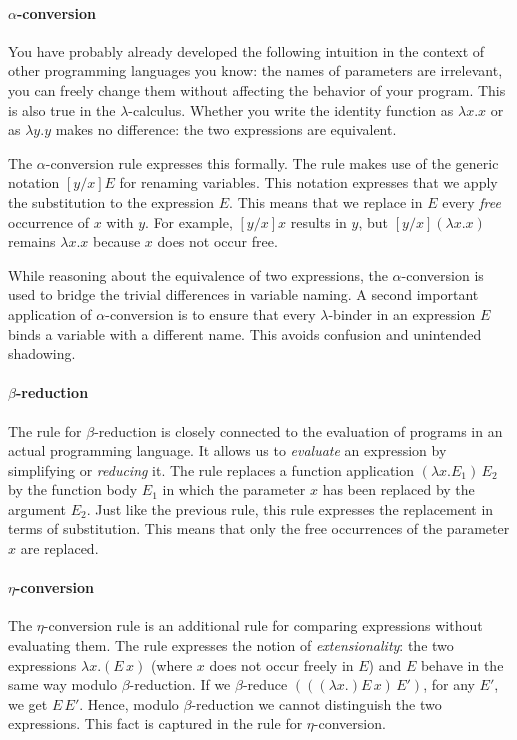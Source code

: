 \paragraph{$\alpha$-conversion}
You have probably already developed the following intuition in the context of
other programming languages you know: the names of parameters are irrelevant,
you can freely change them without affecting the behavior of your program.
This is also true in the $\lambda$-calculus. Whether you write the identity
function as $\lambda x.x$ or as $\lambda y.y$ makes no difference: the two
expressions are equivalent.

The $\alpha$-conversion rule expresses this formally. The rule
makes use of the generic notation
$[y/x]E$ for renaming variables. This notation expresses that
we apply the substitution to the expression
$E$. This means that we replace in $E$ every \textit{free} occurrence of $x$ 
with $y$. For example, $[y/x]x$ results in $y$, but $[y/x](\lambda x.x)$ remains $\lambda x.x$
because $x$ does not occur free.

While reasoning about the equivalence of two expressions, the
$\alpha$-conversion is used to bridge the trivial differences in variable
naming. A second important application of $\alpha$-conversion is to ensure that
every $\lambda$-binder in an expression $E$ binds a variable with a different name.
This avoids confusion and unintended shadowing.

\paragraph{$\beta$-reduction}
The rule for $\beta$-reduction is closely connected to the evaluation
of programs in an actual programming language. It allows us to \emph{evaluate}
an expression by simplifying or \emph{reducing} it. The rule replaces a function
application $(\lambda x.E_1)\,E_2$ by the function body
$E_1$ in which the parameter $x$ has been replaced by the argument
$E_2$. Just like the previous rule, this rule expresses the replacement in terms of substitution.
This means that only the free occurrences of the parameter $x$ are replaced.

\paragraph{$\eta$-conversion}
The 
$\eta$-conversion rule is an additional rule for comparing expressions without
evaluating them. The rule expresses the notion of \emph{extensionality}:
the two expressions $\lambda x.(E\,x)$
(where $x$ does not occur freely in $E$) and $E$
behave in the same way modulo $\beta$-reduction.
If we  $\beta$-reduce $(((\lambda x.)E\,x)\,E')$,
for any $E'$, we get $E\,E'$. Hence, modulo $\beta$-reduction
we cannot distinguish the two expressions. This fact is captured 
in the rule for $\eta$-conversion.

